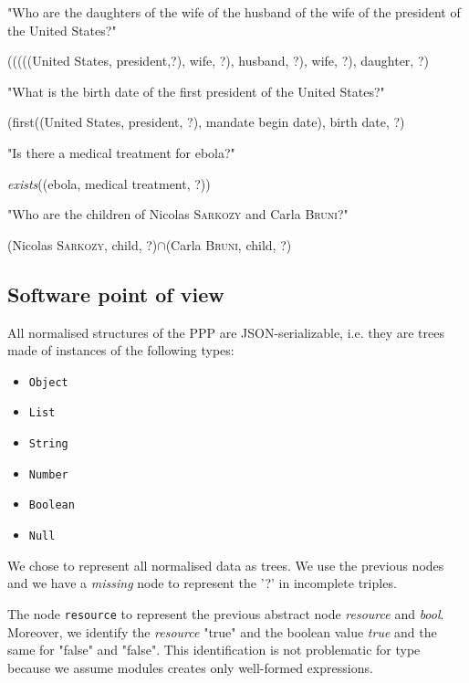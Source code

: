 \bigskip

"Who are the daughters of the wife of the husband of the wife of the president of the United States?"
\begin{center}
(((((United States, president,?), wife, ?), husband, ?), wife, ?), daughter, ?)
\end{center}

\bigskip

"What is the birth date of the first president of the United States?"
\begin{center}(first((United States, president, ?), mandate begin date), birth date, ?)\end{center}

\bigskip

"Is there a medical treatment for ebola?"
\begin{center}\textsl{exists}((ebola, medical treatment, ?))\end{center}

\bigskip

"Who are the children of Nicolas \textsc{Sarkozy} and Carla \textsc{Bruni}?"
\begin{center}(Nicolas \textsc{Sarkozy}, child, ?)$\cap$(Carla \textsc{Bruni}, child, ?)\end{center}

\subsection{Software point of view}

All normalised structures of the PPP are JSON-serializable, i.e. they are trees made of instances of the following types:
\begin{itemize}
    \item \texttt{Object}
    \item \texttt{List}
    \item \texttt{String}
    \item \texttt{Number}
    \item \texttt{Boolean}
    \item \texttt{Null}
\end{itemize}

We chose to represent all normalised data as trees. We use the previous nodes and we have a \textsl{missing} node to represent the '?' in incomplete triples.

The node \texttt{resource} to represent the previous abstract node \textsl{resource} and \textsl{bool}. Moreover, we identify the \textsl{resource} "true" and the boolean value \textsl{true} and the same for "false" and "false". This identification is not problematic for type because we assume modules creates only well-formed expressions.

